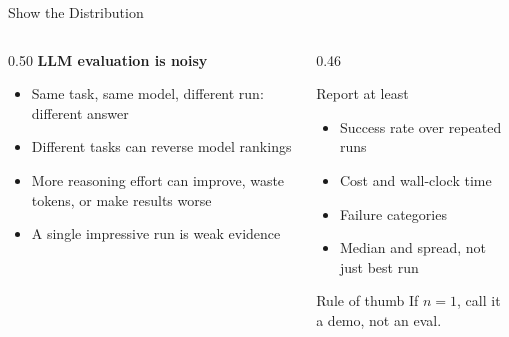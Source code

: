 \begin{frame}{Show the Distribution}
  \begin{columns}[T, onlytextwidth]
    \begin{column}{0.50\textwidth}
      \textbf{LLM evaluation is noisy}\\[0.3em]
      \begin{itemize}
        \item Same task, same model, different run: different answer
        \item Different tasks can reverse model rankings
        \item More reasoning effort can improve, waste tokens, or make results worse
        \item A single impressive run is weak evidence
      \end{itemize}
    \end{column}
    \hfill
    \begin{column}{0.46\textwidth}
      \begin{block}{Report at least}
        \begin{itemize}
          \item Success rate over repeated runs
          \item Cost and wall-clock time
          \item Failure categories
          \item Median and spread, not just best run
        \end{itemize}
      \end{block}
      \vspace{0.3em}
      \begin{alertblock}{Rule of thumb}
        If $n=1$, call it a demo, not an eval.
      \end{alertblock}
    \end{column}
  \end{columns}
\end{frame}


